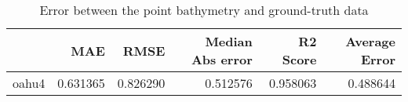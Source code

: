 \begin{table}[h!]
\caption{Error between the point bathymetry and ground-truth data}
\label{tab:oahu4_lidar_error}
\begin{tabular}{lrrrrr}
\toprule
 & MAE & RMSE & Median Abs error & R2 Score & Average Error \\
\midrule
oahu4 & 0.631365 & 0.826290 & 0.512576 & 0.958063 & 0.488644 \\
\bottomrule
\end{tabular}
\end{table}
